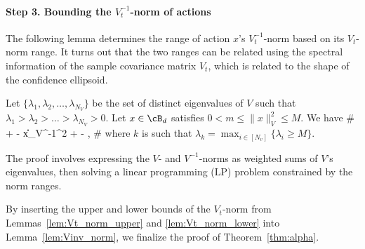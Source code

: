 \paragraph{Step 3. Bounding the $V_t^{-1}$-norm of actions}


The following lemma determines the range of action $x$'s $V_t^{-1}$-norm based on its $V_t$-norm range. It turns out that the two ranges can be related using the spectral information of the sample covariance matrix $V_t$, which is related to the shape of the confidence ellipsoid.


\begin{lemma}
\label{lem:Vinv_norm}
Let $\{\lambda_1,\lambda_2,\dots, \lambda_{N_V}\}$ be the set of distinct eigenvalues of $V$ such that $\lambda_1>\lambda_2>\dots> \lambda_{N_V}>0$. Let $x\in \cB_d$ satisfies
	$
	0< m \leq \|x\|_{V}^2 \leq M
	$. We have
	\#
	 +    -  \leq \|x\|_{V^{-1}}^2  \leq  {} +    - ,
	\#
	where $k$ is such that $\lambda_{k} = \max_{i \in[N_v]} \{\lambda_i  \geq M\}$.
\end{lemma}

The proof involves expressing the $V$- and $V^{-1}$-norms as weighted sums of $V$'s eigenvalues, then solving a linear programming (LP) problem constrained by the norm ranges.




By inserting the upper and lower bounds of the $V_t$-norm from Lemmas~\ref{lem:Vt_norm_upper} and \ref{lem:Vt_norm_lower} into Lemma~\ref{lem:Vinv_norm}, we finalize the proof of Theorem~\ref{thm:alpha}.
















